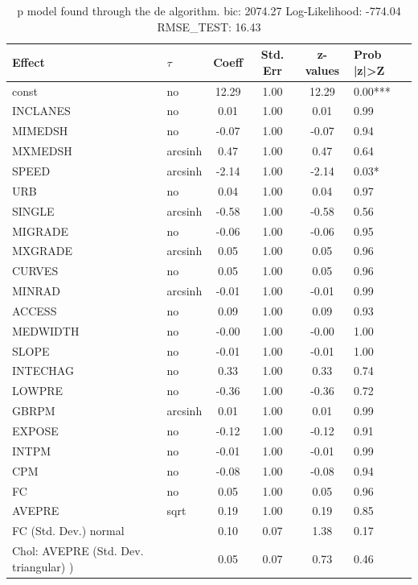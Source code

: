\begin{table}
	\caption{p model found through the de algorithm. bic: 2074.27 Log-Likelihood: -774.04 RMSE_TEST: 16.43}
	\begin{center}
		\begin{tabular}{|l|l|c|c|c|l|}
			\hline
			Effect & $\tau$ & Coeff & Std. Err & z-values & Prob |z|>Z \\
			\hline
			const & no & 12.29 & 1.00 & 12.29 & 0.00*** \\
			\hline
			INCLANES & no & 0.01 & 1.00 & 0.01 & 0.99 \\
			\hline
			MIMEDSH & no & -0.07 & 1.00 & -0.07 & 0.94 \\
			\hline
			MXMEDSH & arcsinh & 0.47 & 1.00 & 0.47 & 0.64 \\
			\hline
			SPEED & arcsinh & -2.14 & 1.00 & -2.14 & 0.03* \\
			\hline
			URB & no & 0.04 & 1.00 & 0.04 & 0.97 \\
			\hline
			SINGLE & arcsinh & -0.58 & 1.00 & -0.58 & 0.56 \\
			\hline
			MIGRADE & no & -0.06 & 1.00 & -0.06 & 0.95 \\
			\hline
			MXGRADE & arcsinh & 0.05 & 1.00 & 0.05 & 0.96 \\
			\hline
			CURVES & no & 0.05 & 1.00 & 0.05 & 0.96 \\
			\hline
			MINRAD & arcsinh & -0.01 & 1.00 & -0.01 & 0.99 \\
			\hline
			ACCESS & no & 0.09 & 1.00 & 0.09 & 0.93 \\
			\hline
			MEDWIDTH & no & -0.00 & 1.00 & -0.00 & 1.00 \\
			\hline
			SLOPE & no & -0.01 & 1.00 & -0.01 & 1.00 \\
			\hline
			INTECHAG & no & 0.33 & 1.00 & 0.33 & 0.74 \\
			\hline
			LOWPRE & no & -0.36 & 1.00 & -0.36 & 0.72 \\
			\hline
			GBRPM & arcsinh & 0.01 & 1.00 & 0.01 & 0.99 \\
			\hline
			EXPOSE & no & -0.12 & 1.00 & -0.12 & 0.91 \\
			\hline
			INTPM & no & -0.01 & 1.00 & -0.01 & 0.99 \\
			\hline
			CPM & no & -0.08 & 1.00 & -0.08 & 0.94 \\
			\hline
			FC & no & 0.05 & 1.00 & 0.05 & 0.96 \\
			\hline
			AVEPRE & sqrt & 0.19 & 1.00 & 0.19 & 0.85 \\
			\hline
			FC (Std. Dev.) normal &  & 0.10 & 0.07 & 1.38 & 0.17 \\
			\hline
			 Chol: AVEPRE (Std. Dev. triangular) ) &  & 0.05 & 0.07 & 0.73 & 0.46 \\
			\hline
		\end{tabular}
	\end{center}
\end{table}
